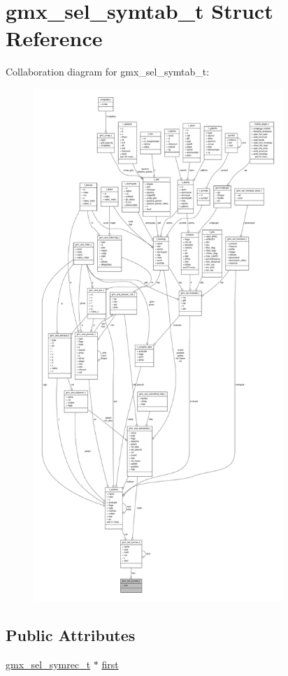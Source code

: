 \hypertarget{structgmx__sel__symtab__t}{\section{gmx\-\_\-sel\-\_\-symtab\-\_\-t \-Struct \-Reference}
\label{structgmx__sel__symtab__t}
}


\-Collaboration diagram for gmx\-\_\-sel\-\_\-symtab\-\_\-t\-:
\nopagebreak
\begin{figure}[H]
\begin{center}
\leavevmode
\includegraphics[height=550pt]{structgmx__sel__symtab__t__coll__graph}
\end{center}
\end{figure}
\subsection*{\-Public \-Attributes}
\begin{DoxyCompactItemize}
\item 
\hyperlink{structgmx__sel__symrec__t}{gmx\-\_\-sel\-\_\-symrec\-\_\-t} $\ast$ \hyperlink{structgmx__sel__symtab__t_a58897a693e237309c988015ea7249bfd}{first}
\end{DoxyCompactItemize}


